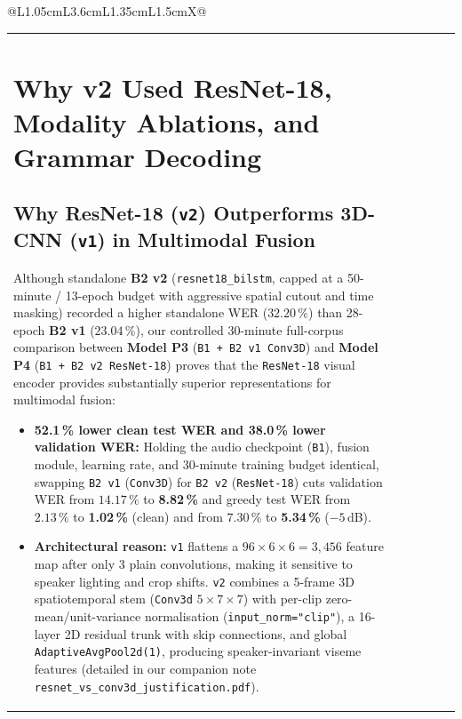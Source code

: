 \documentclass[11pt,a4paper]{article}
\newcommand{\code}[1]{\texttt{\small #1}}
\begin{document}
\begin{table}[htbp]
\begin{tabularx}{\textwidth}{@{}L{1.05cm}L{3.6cm}L{1.35cm}L{1.5cm}X@{}}
\begin{table}[htbp]
\begin{tabularx}{\textwidth}{@{}lccccc@{}}
\section{Why v2 Used ResNet-18, Modality Ablations, and Grammar Decoding}
\label{sec:v2}

\subsection{Why ResNet-18 (\code{v2}) Outperforms 3D-CNN (\code{v1}) in Multimodal Fusion}
Although standalone \textbf{B2 v2} (\code{resnet18\_bilstm}, capped at a 50-minute / 13-epoch budget with aggressive spatial cutout and time masking) recorded a higher standalone WER ($32.20\,\%$) than 28-epoch \textbf{B2 v1} ($23.04\,\%$), our controlled 30-minute full-corpus comparison between \textbf{Model P3} (\code{B1 + B2 v1 Conv3D}) and \textbf{Model P4} (\code{B1 + B2 v2 ResNet-18}) proves that the \code{ResNet-18} visual encoder provides substantially superior representations for multimodal fusion:
\begin{itemize}
  \item \textbf{52.1\,\% lower clean test WER and 38.0\,\% lower validation WER:} Holding the audio checkpoint (\code{B1}), fusion module, learning rate, and 30-minute training budget identical, swapping \code{B2 v1} (\code{Conv3D}) for \code{B2 v2} (\code{ResNet-18}) cuts validation WER from $14.17\,\%$ to \textbf{8.82\,\%} and greedy test WER from $2.13\,\%$ to \textbf{1.02\,\%} (clean) and from $7.30\,\%$ to \textbf{5.34\,\%} ($-5$\,dB).
  \item \textbf{Architectural reason:} \code{v1} flattens a $96{\times}6{\times}6 = 3{,}456$ feature map after only 3 plain convolutions, making it sensitive to speaker lighting and crop shifts. \code{v2} combines a 5-frame 3D spatiotemporal stem (\code{Conv3d} $5{\times}7{\times}7$) with per-clip zero-mean/unit-variance normalisation (\code{input\_norm="clip"}), a 16-layer 2D residual trunk with skip connections, and global \code{AdaptiveAvgPool2d(1)}, producing speaker-invariant viseme features (detailed in our companion note \code{resnet\_vs\_conv3d\_justification.pdf}).
\end{itemize}


\end{tabularx}
\end{table}
\end{tabularx}
\end{table}
\end{document}
